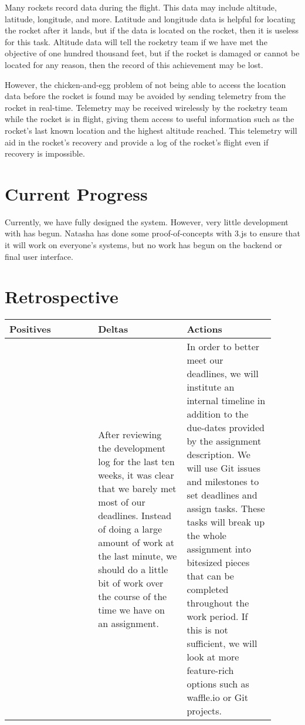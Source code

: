 \documentclass[10pt,draftclsnofoot,onecolumn]{IEEEtran}
\begin{document}
	Many rockets record data during the flight. This data may include
	altitude, latitude, longitude, and more.
	Latitude and longitude
	data is helpful for locating the rocket after it lands, but
	if the data is located on the rocket, then it is useless
	for this task.
	Altitude data will tell the rocketry team if we have
	met the objective of one hundred thousand feet, but if the rocket
	is damaged or cannot be located for any reason, then the record
	of this achievement may be lost.
	
	However, the chicken-and-egg problem of not being able to access
	the location data before the rocket is found may be avoided by sending
	telemetry from the rocket in real-time.
	Telemetry may be received wirelessly
	by the rocketry team while the rocket is in flight, giving them
	access to useful information such as the rocket's last known location
	and the highest altitude reached. This telemetry will aid in the
	rocket's recovery and provide a log of the rocket's flight even if
	recovery is impossible.

\section{Current Progress}
Currently, we have fully designed the system. However, very little development with has begun.
Natasha has done some proof-of-concepts with 3.js to ensure that it will work on everyone's systems,
but no work has begun on the backend or final user interface.

\section{Retrospective}

\begin{tabular}{| p{0.3\linewidth} | p{0.3\linewidth} | p{0.3\linewidth} |}
\hline
Positives & Deltas & Actions\\
\hline

& After reviewing the development log for the last ten weeks, it was clear that we barely met most of our deadlines.
Instead of doing a large amount of work at the last minute, we should do a little bit of work over the course of the time we have on an assignment.
& In order to better meet our deadlines, we will institute an internal timeline in addition to the due-dates provided by the assignment description. We will use Git issues and milestones to set deadlines and assign tasks.
These tasks will break up the whole assignment into bitesized pieces that can be completed throughout the work period.
If this is not sufficient, we will look at more feature-rich options such as waffle.io or Git projects.
\\

\hline
\end{tabular}
\end{document}
